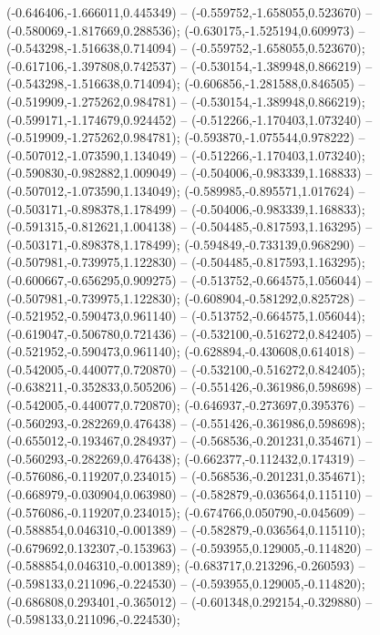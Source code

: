  (-0.646406,-1.666011,0.445349) -- (-0.559752,-1.658055,0.523670) -- (-0.580069,-1.817669,0.288536);
 (-0.630175,-1.525194,0.609973) -- (-0.543298,-1.516638,0.714094) -- (-0.559752,-1.658055,0.523670);
 (-0.617106,-1.397808,0.742537) -- (-0.530154,-1.389948,0.866219) -- (-0.543298,-1.516638,0.714094);
 (-0.606856,-1.281588,0.846505) -- (-0.519909,-1.275262,0.984781) -- (-0.530154,-1.389948,0.866219);
 (-0.599171,-1.174679,0.924452) -- (-0.512266,-1.170403,1.073240) -- (-0.519909,-1.275262,0.984781);
 (-0.593870,-1.075544,0.978222) -- (-0.507012,-1.073590,1.134049) -- (-0.512266,-1.170403,1.073240);
 (-0.590830,-0.982882,1.009049) -- (-0.504006,-0.983339,1.168833) -- (-0.507012,-1.073590,1.134049);
 (-0.589985,-0.895571,1.017624) -- (-0.503171,-0.898378,1.178499) -- (-0.504006,-0.983339,1.168833);
 (-0.591315,-0.812621,1.004138) -- (-0.504485,-0.817593,1.163295) -- (-0.503171,-0.898378,1.178499);
 (-0.594849,-0.733139,0.968290) -- (-0.507981,-0.739975,1.122830) -- (-0.504485,-0.817593,1.163295);
 (-0.600667,-0.656295,0.909275) -- (-0.513752,-0.664575,1.056044) -- (-0.507981,-0.739975,1.122830);
 (-0.608904,-0.581292,0.825728) -- (-0.521952,-0.590473,0.961140) -- (-0.513752,-0.664575,1.056044);
 (-0.619047,-0.506780,0.721436) -- (-0.532100,-0.516272,0.842405) -- (-0.521952,-0.590473,0.961140);
 (-0.628894,-0.430608,0.614018) -- (-0.542005,-0.440077,0.720870) -- (-0.532100,-0.516272,0.842405);
 (-0.638211,-0.352833,0.505206) -- (-0.551426,-0.361986,0.598698) -- (-0.542005,-0.440077,0.720870);
 (-0.646937,-0.273697,0.395376) -- (-0.560293,-0.282269,0.476438) -- (-0.551426,-0.361986,0.598698);
 (-0.655012,-0.193467,0.284937) -- (-0.568536,-0.201231,0.354671) -- (-0.560293,-0.282269,0.476438);
 (-0.662377,-0.112432,0.174319) -- (-0.576086,-0.119207,0.234015) -- (-0.568536,-0.201231,0.354671);
 (-0.668979,-0.030904,0.063980) -- (-0.582879,-0.036564,0.115110) -- (-0.576086,-0.119207,0.234015);
 (-0.674766,0.050790,-0.045609) -- (-0.588854,0.046310,-0.001389) -- (-0.582879,-0.036564,0.115110);
 (-0.679692,0.132307,-0.153963) -- (-0.593955,0.129005,-0.114820) -- (-0.588854,0.046310,-0.001389);
 (-0.683717,0.213296,-0.260593) -- (-0.598133,0.211096,-0.224530) -- (-0.593955,0.129005,-0.114820);
 (-0.686808,0.293401,-0.365012) -- (-0.601348,0.292154,-0.329880) -- (-0.598133,0.211096,-0.224530);
